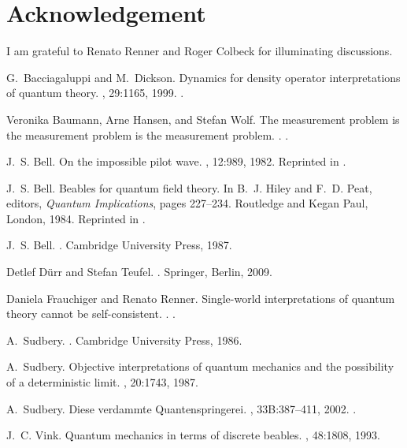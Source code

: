 \documentclass[12pt,a4paper,reqno]{article}
\renewcommand{\(}{\left(}
\renewcommand{\)}{\right)}
\renewcommand{\.}{\centerdot}
\newcommand{\1}{\mathbf{1}}
\newcommand{\<}{\langle}
\renewcommand{\>}{\rangle}
\theoremstyle{definition}
\theoremstyle{remark}
\numberwithin{equation}{section}
\begin{document}
\section*{Acknowledgement}

I am grateful to Renato Renner and Roger Colbeck for illuminating discussions.

%
%

\begin{thebibliography}{10}

G.~Bacciagaluppi and M.~Dickson.
\newblock Dynamics for density operator interpretations of quantum theory.
, 29:1165, 1999.
.

Veronika Baumann, Arne Hansen, and Stefan Wolf.
\newblock The measurement problem is the measurement problem is the measurement
  problem.
.
.

J.~S. Bell.
\newblock On the impossible pilot wave.
, 12:989, 1982.
\newblock Reprinted in \cite{Bell:book}.

J.~S. Bell.
\newblock Beables for quantum field theory.
\newblock In B.~J. Hiley and F.~D. Peat, editors, {\em Quantum Implications},
  pages 227--234. Routledge and Kegan Paul, London, 1984.
\newblock Reprinted in \cite{Bell:book}.

J.~S. Bell.
.
\newblock Cambridge University Press, 1987.

Detlef D{\"u}rr and Stefan Teufel.
.
\newblock Springer, Berlin, 2009.

Daniela Frauchiger and Renato Renner.
\newblock Single-world interpretations of quantum theory cannot be
  self-consistent.
.
.

A.~Sudbery.
.
\newblock Cambridge University Press, 1986.

A.~Sudbery.
\newblock Objective interpretations of quantum mechanics and the possibility of
  a deterministic limit.
, 20:1743, 1987.

A.~Sudbery.
\newblock Diese verdammte {Q}uantenspringerei.
, 33B:387--411, 2002.
.

J.~C. Vink.
\newblock Quantum mechanics in terms of discrete beables.
, 48:1808, 1993.

\end{thebibliography}
\end{document}
